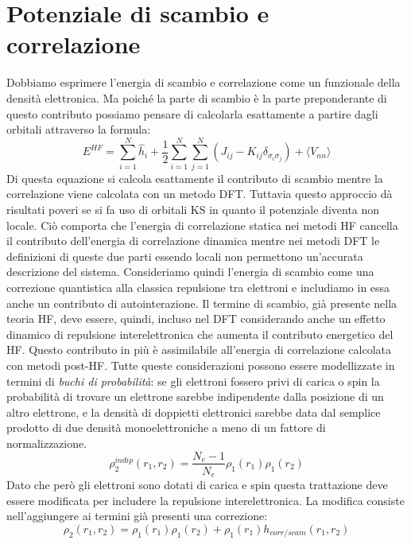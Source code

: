 \documentclass[oneside]{amsbook}
\numberwithin{section}{chapter}
\numberwithin{equation}{section}
\numberwithin{figure}{section}
\begin{document}
\section{Potenziale di scambio e correlazione}
Dobbiamo esprimere l'energia di scambio e correlazione come un funzionale della densità elettronica. Ma poiché la parte di scambio è la parte preponderante di questo contributo possiamo pensare di calcolarla esattamente a partire dagli orbitali attraverso la formula:
 \begin{equation}
 E^{HF}=\sum \limits_{i=1} ^{N}  \hat{h}_{i} + \frac{1}{2} \sum \limits_{i=1} ^{N} \sum \limits_{j=1} ^{N}  (J_{ij}-K_{ij}\delta_{\sigma_i \sigma_j})+\langle V_{nn}\rangle
 \end{equation}
Di questa equazione si calcola esattamente il contributo di scambio mentre la correlazione viene calcolata con un metodo DFT.
Tuttavia questo approccio dà risultati poveri se si fa uso di orbitali KS in quanto il potenziale diventa non locale.
Ciò comporta che  l'energia di correlazione statica nei metodi HF cancella il contributo dell'energia di correlazione dinamica mentre nei metodi DFT le definizioni di queste due parti essendo locali non permettono un'accurata descrizione del sistema.
Consideriamo quindi l'energia di scambio come una correzione quantistica alla classica repulsione tra elettroni e includiamo in essa anche un contributo di autointerazione. Il termine di scambio, già presente nella teoria HF, deve essere, quindi, incluso nel DFT considerando anche un effetto dinamico di repulsione interelettronica che aumenta il contributo energetico del HF. Questo contributo in più è assimilabile all'energia di correlazione calcolata con metodi post-HF.
Tutte queste considerazioni possono essere modellizzate in termini di \emph{buchi di probabilità}: se gli elettroni fossero privi di carica o spin la probabilità di trovare un elettrone sarebbe indipendente dalla posizione di un altro elettrone, e la densità di doppietti elettronici sarebbe data dal semplice prodotto di due densità monoelettroniche a meno di un fattore di normalizzazione. 
\begin{equation}
\rho_2^{indip} (r_1, r_2) = \frac{N_e -1}{N_e}\rho_1(r_1) \rho_1(r_2)
\end{equation}
Dato che però gli elettroni sono dotati di carica e spin questa trattazione deve essere modificata per includere la repulsione interelettronica. La modifica consiste nell'aggiungere ai termini già presenti una correzione:
\begin{equation}
\rho_2(r_1, r_2) = \rho_1(r_1) \rho_1(r_2)+ \rho_1(r_1) h_{corr/scam}(r_1, r_2)
\end{equation}
\end{document}
